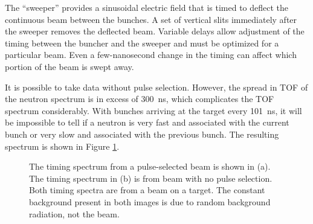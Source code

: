 The ``sweeper'' provides a sinusoidal electric field that is timed to deflect the continuous beam between the bunches.  A set of vertical slits immediately after the sweeper removes the deflected beam.  Variable delays allow adjustment of the timing between the buncher and the sweeper and must be optimized for a particular beam.  Even a few-nanosecond change in the timing can affect which portion of the beam is swept away. 


It is possible to take data without pulse selection.  However, the spread in TOF of the neutron spectrum is in excess of 300~ns, which complicates the TOF spectrum considerably.  With bunches arriving at the target every 101~ns, it will be impossible to tell if a neutron is very fast and associated with the current bunch or very slow and associated with the previous bunch.  The resulting spectrum is shown in Figure \ref{fig:PSvsNPS_TOF}.

\begin{figure}[htp]
\centering
{}
\caption[Timing spectra due to pulse-selected and non-pulse-selected beam.]{The timing spectrum from a pulse-selected beam is shown in (a).  The timing spectrum in (b) is from beam with no pulse selection.  Both timing spectra are from a  beam on a  target.  The constant background present in both images is due to random background radiation, not the beam.}
\label{fig:PSvsNPS_TOF}
\end{figure}

